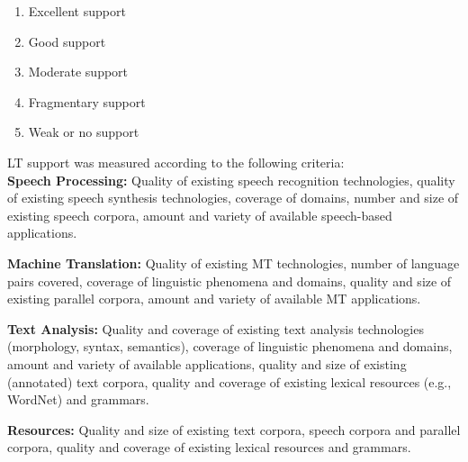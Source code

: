 \begin{multicols}{2}
\begin{enumerate}
\item Excellent support
\item Good support
\item Moderate support
\item Fragmentary support
\item Weak or no support
\end{enumerate}

LT support was measured according to the following criteria:\\
\textbf{Speech Processing:} Quality of existing speech recognition technologies, quality of existing speech synthesis technologies, coverage of domains, number and size of existing speech corpora, amount and variety of available speech-based applications.

\textbf{Machine Translation:} Quality of existing MT technologies, number of language pairs covered, coverage of linguistic phenomena and domains, quality and size of existing parallel corpora, amount and variety of available MT applications.

\textbf{Text Analysis:} Quality and coverage of existing text analysis technologies (morphology, syntax, semantics), coverage of linguistic phenomena and domains, amount and variety of available applications, quality and size of existing (annotated) text corpora, quality and coverage of existing lexical resources (e.g., WordNet) and grammars.

\textbf{Resources:} Quality and size of existing text corpora, speech corpora and parallel corpora, quality and coverage of existing lexical resources and grammars.

    

\end{multicols}
